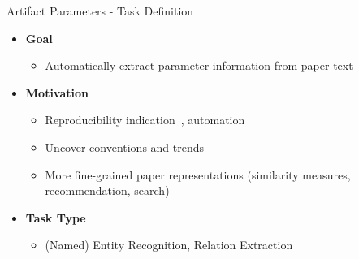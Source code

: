 \documentclass[en,16:9,smallfoot]{sdqbeamer}
\begin{document}
   \begin{frame}{Artifact Parameters - Task Definition}
   \begin{itemize}
       \item \textbf{Goal}
       \begin{itemize}
           \item Automatically extract parameter information from paper text
       \end{itemize}
       \item \textbf{Motivation}
       \begin{itemize}
           \item Reproducibility indication~\cite{Radd2019}, automation~\cite{sethi2018}
           \item Uncover conventions and trends
           \item More fine-grained paper representations (similarity measures, recommendation, search)
       \end{itemize}
       \item \textbf{Task Type}
       \begin{itemize}
           \item (Named) Entity Recognition, Relation Extraction \hphantom{mmmmm} 
       \end{itemize}
   \end{itemize}
   \end{frame}
\end{document}
